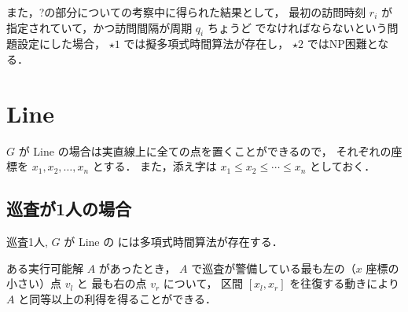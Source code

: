 また，?の部分についての考察中に得られた結果として，
最初の訪問時刻 $r_i$ が指定されていて，かつ訪問間隔が周期 $q_i$ ちょうど
でなければならないという問題設定にした場合，
$\star 1$ では擬多項式時間算法が存在し，
$\star 2$ ではNP困難となる．



\section{Line}

$G$ が Line の場合は実直線上に全ての点を置くことができるので，
それぞれの座標を $x_1, x_2, \ldots, x_n$ とする．
また，添え字は $x_1 \leq x_2 \leq \cdots \leq x_n$ としておく．

\subsection{巡査が1人の場合}


\begin{theo}
	巡査1人, $G$ が Line の \maxprofit には多項式時間算法が存在する．
	\label{theo:PatrolonLine_1}
\end{theo}

\begin{lemm}
	ある実行可能解 $A$ があったとき，
	$A$ で巡査が警備している最も左の（$x$ 座標の小さい）点 $v_l$ と
	最も右の点 $v_r$ について，
	区間 $[x_l, x_r]$ を往復する動きにより $A$ と同等以上の利得を得ることができる．
\end{lemm}

